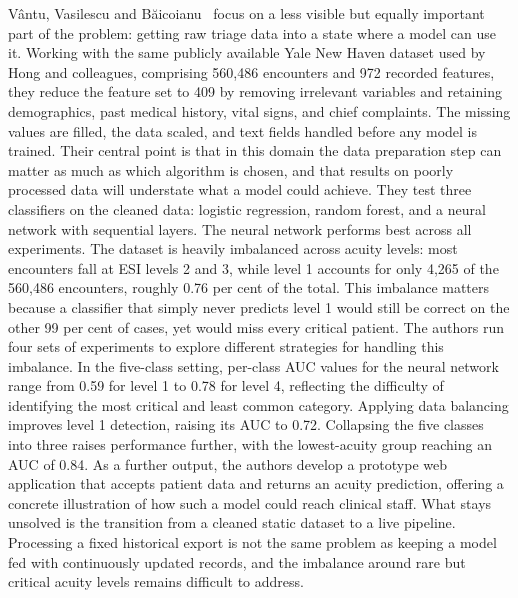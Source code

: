 \documentclass[11pt]{article}
\begin{document}
Vântu, Vasilescu and Băicoianu~\cite{Vantu2023} focus on a less visible but equally important part of the problem: getting raw triage data into a state where a model can use it. Working with the same publicly available Yale New Haven dataset used by Hong and colleagues, comprising 560,486 encounters and 972 recorded features, they reduce the feature set to 409 by removing irrelevant variables and retaining demographics, past medical history, vital signs, and chief complaints. The missing values are filled, the data scaled, and text fields handled before any model is trained. Their central point is that in this domain the data preparation step can matter as much as which algorithm is chosen, and that results on poorly processed data will understate what a model could achieve. They test three classifiers on the cleaned data: logistic regression, random forest, and a neural network with sequential layers. The neural network performs best across all experiments. The dataset is heavily imbalanced across acuity levels: most encounters fall at ESI levels 2 and 3, while level 1 accounts for only 4,265 of the 560,486 encounters, roughly 0.76 per cent of the total. This imbalance matters because a classifier that simply never predicts level 1 would still be correct on the other 99 per cent of cases, yet would miss every critical patient. The authors run four sets of experiments to explore different strategies for handling this imbalance. In the five-class setting, per-class AUC values for the neural network range from 0.59 for level 1 to 0.78 for level 4, reflecting the difficulty of identifying the most critical and least common category. Applying data balancing improves level 1 detection, raising its AUC to 0.72. Collapsing the five classes into three raises performance further, with the lowest-acuity group reaching an AUC of 0.84. As a further output, the authors develop a prototype web application that accepts patient data and returns an acuity prediction, offering a concrete illustration of how such a model could reach clinical staff. What stays unsolved is the transition from a cleaned static dataset to a live pipeline. Processing a fixed historical export is not the same problem as keeping a model fed with continuously updated records, and the imbalance around rare but critical acuity levels remains difficult to address.
\end{document}
